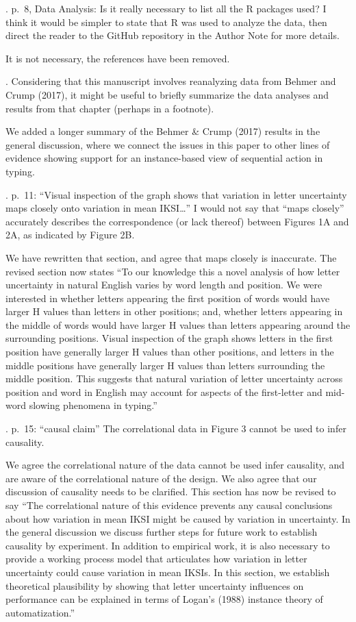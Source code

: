 \documentclass[draft]{article}
\begin{document}
. p.~8, Data Analysis: Is it really necessary to list all the R packages used? I think it would be simpler to state that R was used to analyze the data, then direct the reader to the GitHub repository in the Author Note for more details.

It is not necessary, the references have been removed.

. Considering that this manuscript involves reanalyzing data from Behmer and Crump (2017), it might be useful to briefly summarize the data analyses and results from that chapter (perhaps in a footnote).

We added a longer summary of the Behmer \& Crump (2017) results in the general discussion, where we connect the issues in this paper to other lines of evidence showing support for an instance-based view of sequential action in typing.

. p.~11: ``Visual inspection of the graph shows that variation in letter uncertainty maps closely onto variation in mean IKSI\ldots{}'' I would not say that ``maps closely'' accurately describes the correspondence (or lack thereof) between Figures 1A and 2A, as indicated by Figure 2B.

We have rewritten that section, and agree that maps closely is inaccurate. The revised section now states ``To our knowledge this a novel analysis of how letter uncertainty in natural English varies by word length and position. We were interested in whether letters appearing the first position of words would have larger H values than letters in other positions; and, whether letters appearing in the middle of words would have larger H values than letters appearing around the surrounding positions. Visual inspection of the graph shows letters in the first position have generally larger H values than other positions, and letters in the middle positions have generally larger H values than letters surrounding the middle position. This suggests that natural variation of letter uncertainty across position and word in English may account for aspects of the first-letter and mid-word slowing phenomena in typing.''

. p.~15: ``causal claim'' The correlational data in Figure 3 cannot be used to infer causality.

We agree the correlational nature of the data cannot be used infer causality, and are aware of the correlational nature of the design. We also agree that our discussion of causality needs to be clarified. This section has now be revised to say ``The correlational nature of this evidence prevents any causal conclusions about how variation in mean IKSI might be caused by variation in uncertainty. In the general discussion we discuss further steps for future work to establish causality by experiment. In addition to empirical work, it is also necessary to provide a working process model that articulates how variation in letter uncertainty could cause variation in mean IKSIs. In this section, we establish theoretical plausibility by showing that letter uncertainty influences on performance can be explained in terms of Logan's (1988) instance theory of automatization.''
\end{document}
